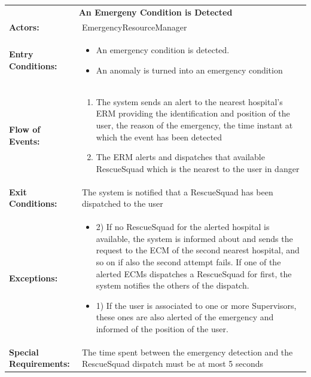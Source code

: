 \begin{table}[H]
	\centering
	{\renewcommand{\arraystretch}{1.5}%
		\begin{tabular}{|@{\hspace{2em}} p{4cm} @{}| p{11cm} @{\qquad}|}
			\cline{1-2}
			\multicolumn{2}{|c|}{\textbf{An Emergeny Condition is Detected}} \\ \cline{1-2}
			\textbf{Actors:} & EmergencyResourceManager \\ \cline{1-2}
			\textbf{Entry Conditions:} & \begin{itemize}[topsep=0em, itemsep=-0.2em]
				\item An emergency condition is detected.
				\item An anomaly is turned into an emergency condition
			\end{itemize} \\ \cline{1-2}
			\textbf{Flow of Events:} & \begin{enumerate}[topsep=0em, itemsep=-0.2em]
				\item The system sends an alert to the nearest hospital's ERM providing the identification and position of the user, the reason of the emergency, the time instant at which the event has been detected
				\item The ERM alerts and dispatches that available RescueSquad which is the nearest to the user in danger
			\end{enumerate}\\ \cline{1-2}
			\textbf{Exit Conditions:} & The system is notified that a RescueSquad has been dispatched to the user \\ \cline{1-2}
			\textbf{Exceptions:} & \begin{itemize}
				\item 2) If no RescueSquad for the alerted hospital is available, the system is informed about and sends the request to the ECM of the second nearest hospital, and so on if also the second attempt fails. If one of the alerted ECMs dispatches a RescueSquad for first, the system notifies the others of the dispatch.
				\item 1) If the user is associated to one or more Supervisors, these ones are also alerted of the emergency and informed of the position of the user. 
			\end{itemize} \\ \cline{1-2}
			\textbf{Special Requirements:} & The time spent between the emergency detection and the RescueSquad dispatch must be at most 5 seconds \\ \cline{1-2}
	\end{tabular}} \quad
\end{table}


